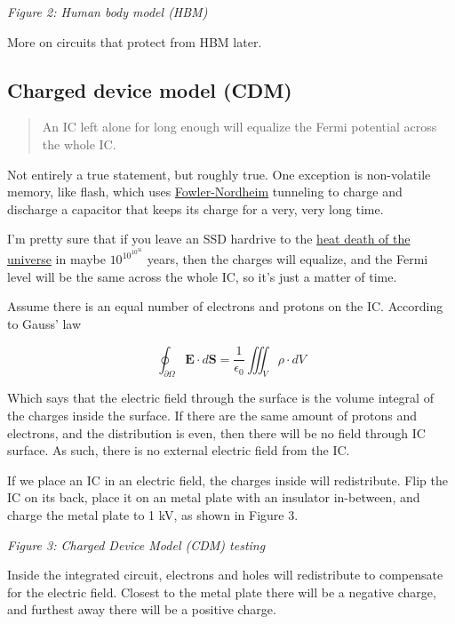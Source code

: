 \emph{Figure 2: Human body model (HBM)}

More on circuits that protect from HBM later.

\subsection{Charged device model (CDM)}\label{charged-device-model-cdm}

\begin{quote}
An IC left alone for long enough will equalize the Fermi potential
across the whole IC.
\end{quote}

Not entirely a true statement, but roughly true. One exception is
non-volatile memory, like flash, which uses
\href{https://en.wikipedia.org/w/index.php?title=Field_electron_emission&oldformat=true\#Fowler–Nordheim_tunneling}{Fowler-Nordheim}
tunneling to charge and discharge a capacitor that keeps its charge for
a very, very long time.

I'm pretty sure that if you leave an SSD hardrive to the
\href{https://en.wikipedia.org/wiki/Heat_death_of_the_universe}{heat
death of the universe} in maybe \(10^{10^{10^{56}}}\) years, then the
charges will equalize, and the Fermi level will be the same across the
whole IC, so it's just a matter of time.

Assume there is an equal number of electrons and protons on the IC.
According to Gauss' law

\[ \oint_{\partial \Omega} \mathbf{E} \cdot d\mathbf{S} = \frac{1}{\epsilon_0} \iiint_{V} \rho
\cdot dV\]

Which says that the electric field through the surface is the volume
integral of the charges inside the surface. If there are the same amount
of protons and electrons, and the distribution is even, then there will
be no field through IC surface. As such, there is no external electric
field from the IC.

If we place an IC in an electric field, the charges inside will
redistribute. Flip the IC on its back, place it on an metal plate with
an insulator in-between, and charge the metal plate to 1 kV, as shown in
Figure 3.


{
\centering
{}
}

\emph{Figure 3: Charged Device Model (CDM) testing}

Inside the integrated circuit, electrons and holes will redistribute to
compensate for the electric field. Closest to the metal plate there will
be a negative charge, and furthest away there will be a positive charge.

